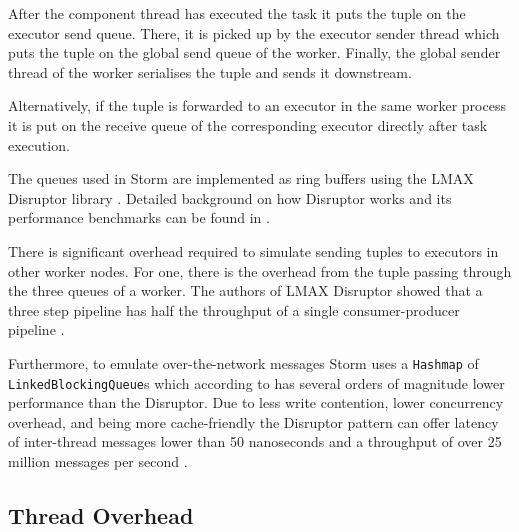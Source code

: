 After the component thread has executed the task it puts the tuple on the executor send queue. There, it is picked up by the executor sender thread which puts the tuple on the global send queue of the worker. Finally, the global sender thread of the worker serialises the tuple and sends it downstream.

Alternatively, if the tuple is forwarded to an executor in the same worker process it is put on the receive queue of the corresponding executor directly after task execution.

The queues used in Storm are implemented as ring buffers using the LMAX Disruptor library \citep{LMAXDisruptor}. Detailed background on how Disruptor works and its performance benchmarks can be found in \citep{Thompson_Farley_Barker_Gee_Stewart_2011}.

There is significant overhead required to simulate sending tuples to executors in other worker nodes. For one, there is the overhead from the tuple passing through the three queues of a worker. The authors of LMAX Disruptor showed that a three step pipeline has half the throughput of a single consumer-producer pipeline \citep{DisruptorWiki}.

Furthermore, to emulate over-the-network messages Storm uses a \texttt{Hashmap} of \texttt{LinkedBlockingQueue}s which according to \cite{Thompson_Farley_Barker_Gee_Stewart_2011} has several orders of magnitude lower performance than the Disruptor. Due to less write contention, lower concurrency overhead, and being more cache-friendly the Disruptor pattern can offer latency of inter-thread messages lower than 50 nanoseconds and a throughput of over 25 million messages per second \cite{Thompson_Farley_Barker_Gee_Stewart_2011}.

\subsection{Thread Overhead}

